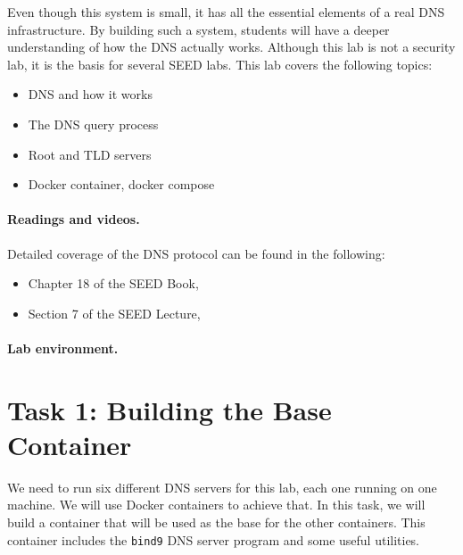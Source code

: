 Even though this system is small, it has all the essential
elements of a real DNS infrastructure. By building such a system,
students will have a deeper understanding of how the DNS actually works. 
Although this lab is not a security lab, it is the basis for
several SEED labs. This lab covers the following topics:

\begin{itemize}[noitemsep]
\item DNS and how it works
\item The DNS query process
\item Root and TLD servers
\item Docker container, docker compose
\end{itemize}



\paragraph{Readings and videos.}
Detailed coverage of the DNS protocol can be found in the following:

\begin{itemize}
\item Chapter 18 of the SEED Book, \seedbook
\item Section 7 of the SEED Lecture, \seedisvideo
\end{itemize}


\paragraph{Lab environment.} 
\seedenvironmentB
\nodependency



\section{Task 1: Building the Base Container}

We need to run six different DNS servers for this lab, each one running on one machine. 
We will use Docker containers to achieve that. In this task, we will
build a container that will be used as the base for the other containers. 
This container includes the 
\texttt{bind9} DNS server program and some useful utilities. 


